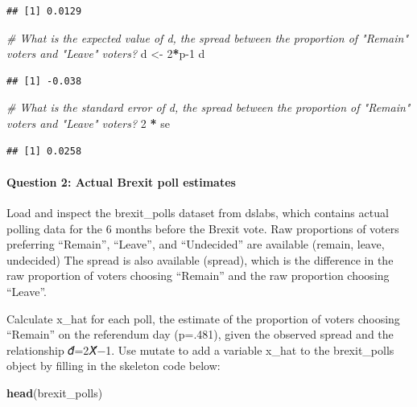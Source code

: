 \documentclass[
]{article}
\newenvironment{Shaded}{\begin{snugshade}}{\end{snugshade}}
\newcommand{\CommentTok}[1]{\textcolor[rgb]{0.56,0.35,0.01}{\textit{#1}}}
\newcommand{\DecValTok}[1]{\textcolor[rgb]{0.00,0.00,0.81}{#1}}
\newcommand{\KeywordTok}[1]{\textcolor[rgb]{0.13,0.29,0.53}{\textbf{#1}}}
\newcommand{\NormalTok}[1]{#1}
\newcommand{\OperatorTok}[1]{\textcolor[rgb]{0.81,0.36,0.00}{\textbf{#1}}}
\newcommand{\StringTok}[1]{\textcolor[rgb]{0.31,0.60,0.02}{#1}}
\begin{document}
\begin{verbatim}
## [1] 0.0129
\end{verbatim}

\begin{Shaded}
\begin{Highlighting}[]
\CommentTok{\# What is the expected value of d, the spread between the proportion of "Remain" voters and "Leave" voters?}
\NormalTok{d \textless{}{-}}\StringTok{ }\DecValTok{2}\OperatorTok{*}\NormalTok{p}\DecValTok{{-}1}
\NormalTok{d}
\end{Highlighting}
\end{Shaded}

\begin{verbatim}
## [1] -0.038
\end{verbatim}

\begin{Shaded}
\begin{Highlighting}[]
\CommentTok{\# What is the standard error of d, the spread between the proportion of "Remain" voters and "Leave" voters?}
\DecValTok{2} \OperatorTok{*}\StringTok{ }\NormalTok{se}
\end{Highlighting}
\end{Shaded}

\begin{verbatim}
## [1] 0.0258
\end{verbatim}

\hypertarget{question-2-actual-brexit-poll-estimates}{%
\paragraph{Question 2: Actual Brexit poll
estimates}\label{question-2-actual-brexit-poll-estimates}}

Load and inspect the brexit\_polls dataset from dslabs, which contains
actual polling data for the 6 months before the Brexit vote. Raw
proportions of voters preferring ``Remain'', ``Leave'', and
``Undecided'' are available (remain, leave, undecided) The spread is
also available (spread), which is the difference in the raw proportion
of voters choosing ``Remain'' and the raw proportion choosing ``Leave''.

Calculate x\_hat for each poll, the estimate of the proportion of voters
choosing ``Remain'' on the referendum day (p=.481), given the observed
spread and the relationship 𝑑̂=2𝑋̂−1. Use mutate to add a variable x\_hat
to the brexit\_polls object by filling in the skeleton code below:

\begin{Shaded}
\begin{Highlighting}[]
\KeywordTok{head}\NormalTok{(brexit\_polls)}
\end{Highlighting}
\end{Shaded}
\end{document}
